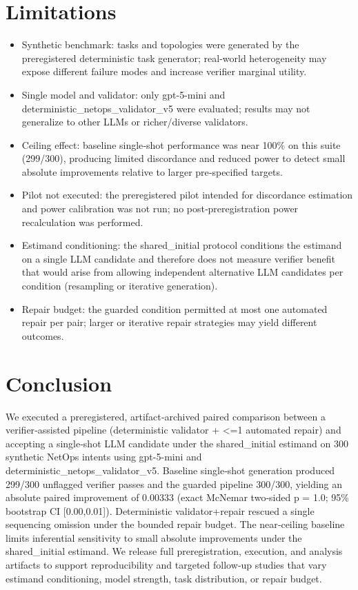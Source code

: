 \documentclass[conference]{IEEEtran}
\begin{document}
\section{Limitations}
\begin{itemize}
\item Synthetic benchmark: tasks and topologies were generated by the preregistered deterministic task generator; real‑world heterogeneity may expose different failure modes and increase verifier marginal utility.
\item Single model and validator: only gpt-5-mini and deterministic\_netops\_validator\_v5 were evaluated; results may not generalize to other LLMs or richer/diverse validators.
\item Ceiling effect: baseline single‑shot performance was near 100\% on this suite (299/300), producing limited discordance and reduced power to detect small absolute improvements relative to larger pre‑specified targets.
\item Pilot not executed: the preregistered pilot intended for discordance estimation and power calibration was not run; no post‑preregistration power recalculation was performed.
\item Estimand conditioning: the shared\_initial protocol conditions the estimand on a single LLM candidate and therefore does not measure verifier benefit that would arise from allowing independent alternative LLM candidates per condition (resampling or iterative generation).
\item Repair budget: the guarded condition permitted at most one automated repair per pair; larger or iterative repair strategies may yield different outcomes.
\end{itemize}

\section{Conclusion}
We executed a preregistered, artifact‑archived paired comparison between a verifier‑assisted pipeline (deterministic validator + <=1 automated repair) and accepting a single‑shot LLM candidate under the shared\_initial estimand on 300 synthetic NetOps intents using gpt-5-mini and deterministic\_netops\_validator\_v5. Baseline single‑shot generation produced 299/300 unflagged verifier passes and the guarded pipeline 300/300, yielding an absolute paired improvement of 0.00333 (exact McNemar two‑sided p = 1.0; 95\% bootstrap CI [0.00,0.01]). Deterministic validator+repair rescued a single sequencing omission under the bounded repair budget. The near‑ceiling baseline limits inferential sensitivity to small absolute improvements under the shared\_initial estimand. We release full preregistration, execution, and analysis artifacts to support reproducibility and targeted follow‑up studies that vary estimand conditioning, model strength, task distribution, or repair budget.
\end{document}
